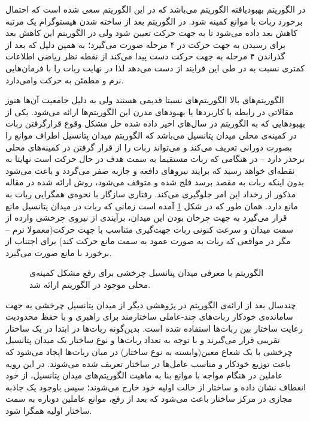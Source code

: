 در الگوریتم  بهبودیافته الگوریتم  می‌باشد که در این الگوریتم سعی شده است که احتمال برخورد ربات با موانع کمینه شود. در الگوریتم  بعد از ساخته شدن هیستوگرام یک مرتبه کاهش بعد داده می‌شود تا به جهت حرکت تعیین شود ولی در الگوریتم  این کاهش بعد برای رسیدن به جهت حرکت در ۴ مرحله صورت می‌گیرد؛ به همین دلیل که  بعد از گذراندن ۴ مرحله به جهت حرکت دست پیدا می‌کند از نقطه نظر ریاضی اطلاعات کمتری نسبت به  در طی این فرایند از دست می‌دهد لذا در نهایت ربات را با فرمان‌هایی نرم و مطمئن به حرکت وامی‌دارد.

الگوریتم‌های بالا الگوریتم‌های نسبتا قدیمی هستند ولی به دلیل جامعیت آن‌ها هنوز مقالاتی در رابطه با کاربردها یا بهبودهای مدرن این الگوریتم‌ها ارائه می‌شود. یکی از بهبودهایی که به الگوریتم  در سال‌های اخیر داده شده حل مشکل وقوع قرارگرفتن ربات در کمینه‌ی محلی میدان پتانسیل می‌باشد که الگوریتم  میدان پتانسیل اطراف موانع را بصورت دورانی تعریف می‌کند و می‌تواند ربات را از قرار گرفتن در کمینه‌های محلی برحذر دارد -- در هنگامی که ربات مستقیما به سمت هدف در حال حرکت است نهایتا به نقطه‌ای خواهد رسید که برایند نیروهای دافعه و جازبه صفر می‌گردد و باعث می‌شود بدون اینکه ربات به مقصد برسد فلج شده و متوقف می‌شود، روش ارائه شده در مقاله مذکور از رخداد این امر جلوگیری می‌کند.  رفتاری سازگار با نحوه‌ی همگرایی ربات به مانع دارد. همان طور که در شکل \ref{fig:apf} آمده است زمانی که ربات در میدان پتانسیل مانع قرار می‌گیرد به جهت چرخان بودن این میدان، برآیندی از نیروی چرخشی وارده از سمت میدان و سرعت کنونی ربات جهت‌گیری متناسب با جهت حرکت(معمولا نرم -- مگر در مواقعی که ربات به صورت عمود به سمت مانع حرکت کند) برای اجتناب از برخورد با مانع صورت می‌گیرد.

\begin{figure}
\centering
{}
\caption{الگوریتم  با معرفی میدان پتانسیل چرخشی برای رفع مشکل کمینه‌ی محلی موجود در الگوریتم  ارائه شد.}
\label{fig:apf}
\end{figure}

چندسال بعد از ارائه‌ی الگوریتم  در پژوهشی دیگر از میدان پتانسیل چرخشی به جهت سامانده‌ی خودکار ربات‌های چند-عاملی ساختارمند برای راهبری و  با حفظ محدودیت رعایت ساختار بین ربات‌ها استفاده شده است. بدین‌گونه ربات‌ها در ابتدا در یک ساختار تقریبی قرار می‌گیرند و با توجه به تعداد ربات‌ها و نوع ساختار یک میدان پتانسیل چرخشی با یک شعاع معین(وابسته به نوع ساختار) در میان ربات‌ها ایجاد می‌شود که باعث توزیع خودکار و مناسب عامل‌ها در ساختار تعریف شده می‌شوند. در این رویه عاملین در هنگام مواجه با موانع بنا به ماهیت الگوریتم‌های میدان پتانسیل، از خود انعطاف نشان داده و ساختار از حالت اولیه خود خارج می‌شو‌ند؛ سپس باوجود یک جاذبه مجازی در مرکز ساختار باعث می‌شود که بعد از رفع، موانع عاملین دوباره به سمت ساختار اولیه همگرا شود.

